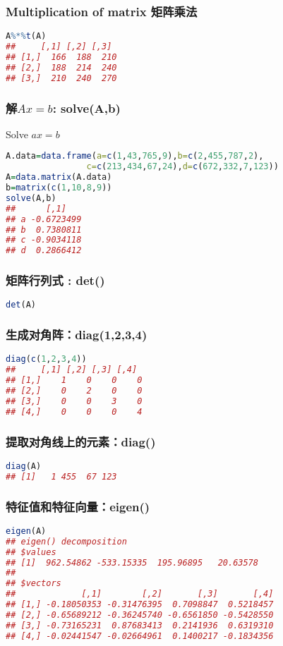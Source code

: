 \documentclass[11pt,a4paper]{article}
\begin{document}
\subsubsection{Multiplication of matrix 矩阵乘法}
\begin{lstlisting}[language=R]
A%*%t(A)
##     [,1] [,2] [,3]
## [1,]  166  188  210
## [2,]  188  214  240
## [3,]  210  240  270
\end{lstlisting}
\subsubsection{解$Ax=b$: solve(A,b)}
Solve $ax=b$
\begin{lstlisting}[language=R]
A.data=data.frame(a=c(1,43,765,9),b=c(2,455,787,2),
                c=c(213,434,67,24),d=c(672,332,7,123))
A=data.matrix(A.data)
b=matrix(c(1,10,8,9))
solve(A,b)
##      [,1]
## a -0.6723499
## b  0.7380811
## c -0.9034118
## d  0.2866412
\end{lstlisting}

\subsubsection{矩阵行列式 : det()}
\begin{lstlisting}[language=R]
det(A)
\end{lstlisting}
\subsubsection{生成对角阵：diag(1,2,3,4)}
\begin{lstlisting}[language=R]
diag(c(1,2,3,4))
##     [,1] [,2] [,3] [,4]
## [1,]    1    0    0    0
## [2,]    0    2    0    0
## [3,]    0    0    3    0
## [4,]    0    0    0    4
\end{lstlisting}
\subsubsection{提取对角线上的元素：diag()}
\begin{lstlisting}[language=R]
diag(A)
## [1]   1 455  67 123
\end{lstlisting}
\subsubsection{特征值和特征向量：eigen()}
\begin{lstlisting}[language=R]
eigen(A)
## eigen() decomposition
## $values
## [1]  962.54862 -533.15335  195.96895   20.63578
## 
## $vectors
##             [,1]        [,2]       [,3]       [,4]
## [1,] -0.18050353 -0.31476395  0.7098847  0.5218457
## [2,] -0.65689212 -0.36245740 -0.6561850 -0.5428550
## [3,] -0.73165231  0.87683413  0.2141936  0.6319310
## [4,] -0.02441547 -0.02664961  0.1400217 -0.1834356
\end{lstlisting}
\end{document}
